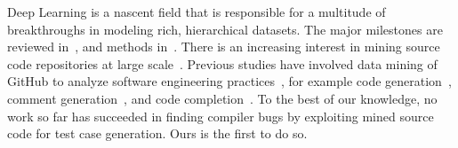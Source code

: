 
Deep Learning is a nascent field that is responsible for a multitude of breakthroughs in modeling rich, hierarchical datasets. The major milestones are reviewed in~\cite{Wang2017}, and methods in~\cite{Schmidhuber2014}. There is an increasing interest in mining source code repositories at large scale~\cite{Allamanis2017a}.  
Previous studies have involved data mining of GitHub to analyze software engineering practices~\cite{Wu2014,Guzman2014,Baishakhi2014a,Vasilescu2015}, for example code generation~\cite{Zhang2015a}, comment generation~\cite{Wong2013}, and code completion~\cite{Raychev2014}. 
To the best of our knowledge, no work so far has succeeded in finding compiler bugs by exploiting mined source code for test case generation. Ours is the first to do so.
